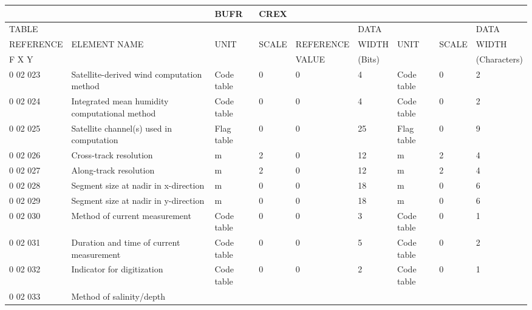 \begin{longtable}[]{@{}lllllllll@{}}
\toprule
& & BUFR & CREX & & & & &\tabularnewline
\midrule
\endhead
TABLE & & & & & DATA & & & DATA\tabularnewline
REFERENCE & ELEMENT NAME & UNIT & SCALE & REFERENCE & WIDTH & UNIT & SCALE & WIDTH\tabularnewline
F X Y & & & & VALUE & (Bits) & & & (Characters)\tabularnewline
0 02 023 & Satellite-derived wind computation method & Code table & 0 & 0 & 4 & Code table & 0 & 2\tabularnewline
0 02 024 & Integrated mean humidity computational method & Code table & 0 & 0 & 4 & Code table & 0 & 2\tabularnewline
0 02 025 & Satellite channel(s) used in computation & Flag table & 0 & 0 & 25 & Flag table & 0 & 9\tabularnewline
0 02 026 & Cross-track resolution & m & 2 & 0 & 12 & m & 2 & 4\tabularnewline
0 02 027 & Along-track resolution & m & 2 & 0 & 12 & m & 2 & 4\tabularnewline
0 02 028 & Segment size at nadir in x-direction & m & 0 & 0 & 18 & m & 0 & 6\tabularnewline
0 02 029 & Segment size at nadir in y-direction & m & 0 & 0 & 18 & m & 0 & 6\tabularnewline
0 02 030 & Method of current measurement & Code table & 0 & 0 & 3 & Code table & 0 & 1\tabularnewline
0 02 031 & Duration and time of current measurement & Code table & 0 & 0 & 5 & Code table & 0 & 2\tabularnewline
0 02 032 & Indicator for digitization & Code table & 0 & 0 & 2 & Code table & 0 & 1\tabularnewline
\begin{minipage}[t]{0.08\columnwidth}\raggedright
0 02 033\strut
\end{minipage} & \begin{minipage}[t]{0.08\columnwidth}\raggedright
Method of salinity/depth


\end{minipage}
\end{longtable}

